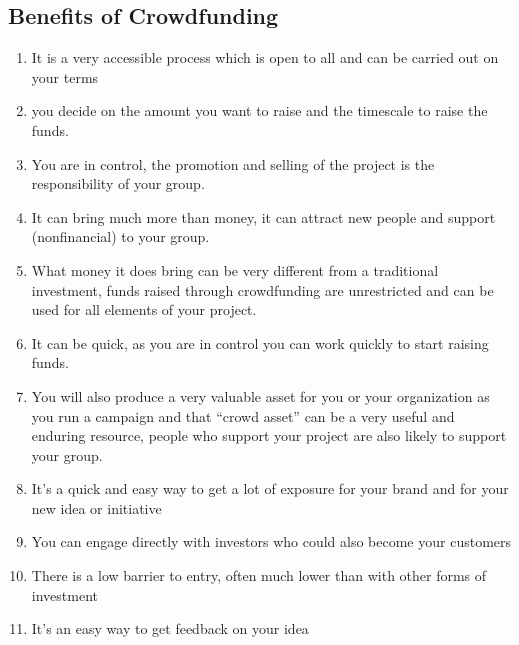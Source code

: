 \subsection*{ Benefits of Crowdfunding }
\begin{enumerate}
      \item It is a very accessible process which is open to all and can be carried out on your terms
      \item you decide on the amount you want to raise and the timescale to raise the funds.
      \item You are in control, the promotion and selling of the project is the responsibility of your group.
      \item It can bring much more than money, it can attract new people and support (nonfinancial) to your group.
      \item What money it does bring can be very different from a traditional investment, funds raised through crowdfunding are unrestricted and can be used for all elements of your project.
      \item It can be quick, as you are in control you can work quickly to start raising funds.
      \item You will also produce a very valuable asset for you or your organization as you run a campaign and that “crowd asset” can be a very useful and enduring resource, people who support your project are also likely to support your group.
      \item It’s a quick and easy way to get a lot of exposure for your brand and for your new idea or initiative
      \item You can engage directly with investors who could also become your customers
      \item There is a low barrier to entry, often much lower than with other forms of investment
      \item It’s an easy way to get feedback on your idea
\end{enumerate}


